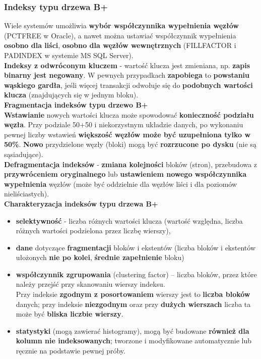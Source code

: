 \documentclass[a4paper]{article}
\begin{document}
\subsubsection{Indeksy typu drzewa B+}
Wiele systemów umożliwia \textbf{wybór współczynnika wypełnienia węzłów} (PCTFREE w Oracle), a nawet można ustawiać współczynnik wypełnienia \textbf{osobno dla liści}, \textbf{osobno dla węzłów wewnętrznych} (FILLFACTOR i PADINDEX w systemie MS SQL Server).\\
\textbf{Indeksy z odwróconym kluczem} - wartość klucza jest zmieniana, np. \textbf{zapis binarny jest negowany}. W pewnych przypadkach \textbf{zapobiega} to \textbf{powstaniu wąskiego gardła}, jeśli więcej transakcji odwołuje się do \textbf{podobnych wartości klucza} (znajdujących się w jednym bloku).\\

\textbf{Fragmentacja indeksów typu drzewo B+}\\
\textbf{Wstawianie} nowych wartości klucza może spowodować
\textbf{konieczność podziału węzła}. Przy podziale 50+50 i
niekorzystnym układzie danych, po wykonaniu pewnej liczby
wstawień \textbf{większość węzłów może być uzupełniona tylko w 50\%}. \textbf{Nowo} przydzielone węzły (bloki) mogą być \textbf{rozrzucone po dysku} (nie są sąsiadujące).\\

\textbf{Defragmentacja indeksów} - \textbf{zmiana kolejności} bloków (stron), przebudowa z \textbf{przywróceniem oryginalnego} lub \textbf{ustawieniem nowego współczynnika wypełnienia} węzłów (może być oddzielnie dla węzłów liści i dla poziomów nieliściastych). \\

\textbf{Charakteryzacja indeksów typu drzewa B+}
\begin{itemize}
    \item \textbf{selektywność} - liczba różnych wartości klucza (wartość względna, liczba różnych wartości podzielona przez liczbę wierszy),
    \item \textbf{dane} dotyczące \textbf{fragmentacji} bloków i ekstentów (liczba bloków i ekstentów ułożonych \textbf{nie po kolei}, \textbf{średnie zapełnienie} bloku)
    \item \textbf{współczynnik zgrupowania} (clustering factor) – liczba bloków, przez które należy przejść przy skanowaniu wierszy indeksu.\\ 
    Przy indeksie \textbf{zgodnym z posortowaniem} wierszy jest to \textbf{liczba bloków} danych; przy indeksie \textbf{niezgodnym}  oraz przy \textbf{dużych wierszach} liczba ta może być \textbf{bliska liczbie wierszy}.
    \item \textbf{statystyki} (mogą zawierać histogramy), mogą być budowane \textbf{również dla kolumn nie indeksowanych}; tworzone i modyfikowane automatycznie lub ręcznie na podstawie pewnej próby.
\end{itemize}
\end{document}
